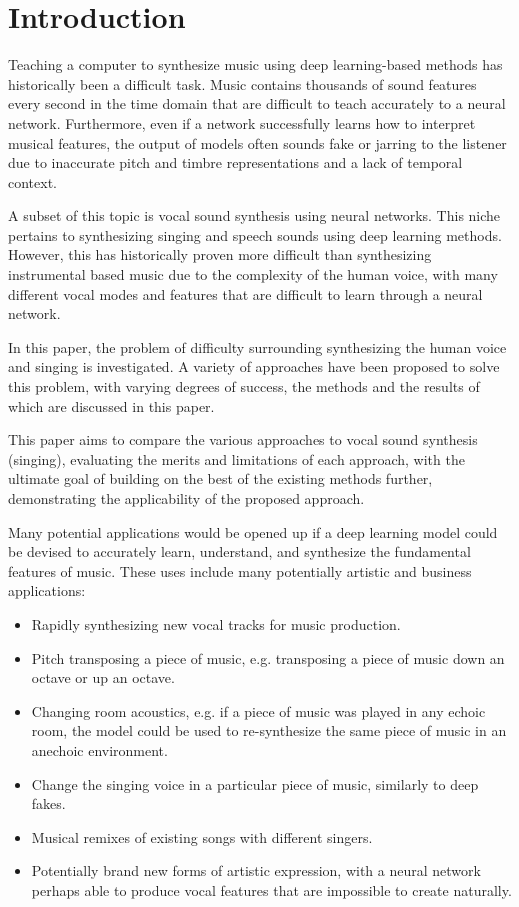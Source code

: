 \chapter{Introduction}

Teaching a computer to synthesize music using deep learning-based methods has historically been a difficult task. Music contains thousands of sound features every second in the time domain that are difficult to teach accurately to a neural network. Furthermore, even if a network successfully learns how to interpret musical features, the output of models often sounds fake or jarring to the listener due to inaccurate pitch and timbre representations and a lack of temporal context.

A subset of this topic is vocal sound synthesis using neural networks. This niche pertains to synthesizing singing and speech sounds using deep learning methods. However, this has historically proven more difficult than synthesizing instrumental based music due to the complexity of the human voice, with many different vocal modes and features that are difficult to learn through a neural network.

In this paper, the problem of difficulty surrounding synthesizing the human voice and singing is investigated. A variety of approaches have been proposed to solve this problem, with varying degrees of success, the methods and the results of which are discussed in this paper.

This paper aims to compare the various approaches to vocal sound synthesis (singing), evaluating the merits and limitations of each approach, with the ultimate goal of building on the best of the existing methods further, demonstrating the applicability of the proposed approach.

Many potential applications would be opened up if a deep learning model could be devised to accurately learn, understand, and synthesize the fundamental features of music. These uses include many potentially artistic and business applications:

\begin{itemize}
    \item Rapidly synthesizing new vocal tracks for music production.
    \item Pitch transposing a piece of music, e.g. transposing a piece of music down an octave or up an octave.
    \item Changing room acoustics, e.g. if a piece of music was played in any echoic room, the model could be used to re-synthesize the same piece of music in an anechoic environment.
    \item Change the singing voice in a particular piece of music, similarly to deep fakes.
    \item Musical remixes of existing songs with different singers.
    \item Potentially brand new forms of artistic expression, with a neural network perhaps able to produce vocal features that are impossible to create naturally.
\end{itemize}



